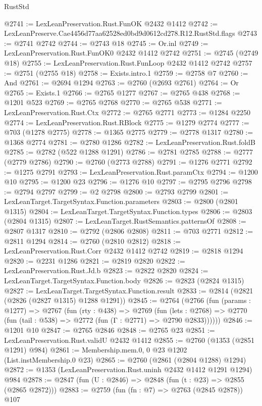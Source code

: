 \begin{lexlean}{RustStd}
\begin{coremodule}
@2741 := LexLeanPreservation.Rust.FunOK @2432 @1412
@2742 := LexLeanPreserve.Cae4456d77aa62528ed0bd9d0612cd278.R12.RustStd.flags
@2743 := @2741 @2742
@2744 := @2743 @18
@2745 := Or.inl
@2749 := LexLeanPreservation.Rust.FunOK0 @2432 @1412 @2742
@2751 := @2745 (@2749 @18)
@2755 := LexLeanPreservation.Rust.FunLoop @2432 @1412 @2742
@2757 := @2751 (@2755 @18)
@2758 := Exists.intro.{1}
@2759 := @2758 @7
@2760 := And
@2761 := @2694 @1294
@2763 := @2760 (@2693 @2761)
@2764 := Or
@2765 := Exists.{1}
@2766 := @2765 @1277
@2767 := @2765 @438
@2768 := @1201 @523
@2769 := @2765 @2768
@2770 := @2765 @538
@2771 := LexLeanPreservation.Rust.Ctx
@2772 := @2765 @2771
@2773 := @1284 @2250
@2774 := LexLeanPreservation.Rust.RBlock
@2775 := @1279 @2774
@2777 := @703 (@1278 @2775)
@2778 := @1365 @2775
@2779 := @2778 @1317
@2780 := @1368 @2774
@2781 := @2780 @1286
@2782 := LexLeanPreservation.Rust.foldB
@2785 := @2782 (@522 @1288 @1291)
@2786 := @2781 @2785
@2788 := @2777 (@2779 @2786)
@2790 := @2760 (@2773 @2788)
@2791 := @1276 @2771
@2792 := @1275 @2791
@2793 := LexLeanPreservation.Rust.paramCtx
@2794 := @1200 @10
@2795 := @1200 @23
@2796 := @1276 @10
@2797 := @2795 @2796
@2798 := @2794 @2797
@2799 := @2 @2798
@2800 := @2793 @2799
@2801 := LexLeanTarget.TargetSyntax.Function.parameters
@2803 := @2800 (@2801 @1315)
@2804 := LexLeanTarget.TargetSyntax.Function.types
@2806 := @2803 (@2804 @1315)
@2807 := LexLeanTarget.RustSemantics.patternsOf
@2808 := @2807 @1317
@2810 := @2792 (@2806 @2808)
@2811 := @703 @2771
@2812 := @2811 @1294
@2814 := @2760 (@2810 @2812)
@2818 := LexLeanPreservation.Rust.Corr @2432 @1412 @2742
@2819 := @2818 @1294
@2820 := @2231 @1286
@2821 := @2819 @2820
@2822 := LexLeanPreservation.Rust.Jd.b
@2823 := @2822 @2820
@2824 := LexLeanTarget.TargetSyntax.Function.body
@2826 := @2823 (@2824 @1315)
@2827 := LexLeanTarget.TargetSyntax.Function.result
@2833 := @2814 (@2821 (@2826 (@2827 @1315) @1288 @1291))
@2845 := @2764
    (@2766
      (fun (params : @1277) =>
      @2767
        (fun (rty : @438) =>
        @2769
          (fun (lets : @2768) =>
          @2770 (fun (tail : @538) => @2772 (fun (Γ : @2771) => @2790 @2833))))))
@2846 := @1201 @10
@2847 := @2765 @2846
@2848 := @2765 @23
@2851 := LexLeanPreservation.Rust.validU @2432 @1412
@2855 := @2760 (@1353 (@2851 @1291) @984)
@2861 := Membership.mem.{0, 0} @23 @1202 (List.instMembership.{0} @23)
@2865 := @2760 (@2861 (@2804 @1288) @1294)
@2872 := @1353 (LexLeanPreservation.Rust.uninh @2432 @1412 @1291 @1294) @984
@2878 := @2847 (fun (U : @2846) => @2848 (fun (t : @23) => @2855 (@2865 @2872)))
@2883 := @2759 (fun (fn : @7) => @2763 (@2845 @2878)) @107

\end{coremodule}
\end{lexlean}
